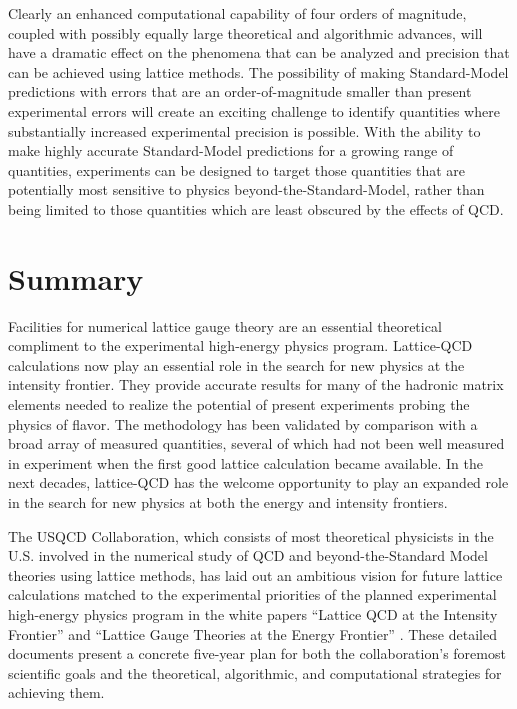 Clearly an enhanced computational capability of four orders of magnitude,
coupled with possibly equally large theoretical and algorithmic advances, will
have a dramatic effect on the phenomena that can be analyzed and precision
that can be achieved using lattice methods.  The possibility of making
Standard-Model predictions with errors that are an order-of-magnitude smaller
than present experimental errors will create an exciting challenge to identify
quantities where substantially increased experimental precision is possible.
With the ability to make highly accurate Standard-Model predictions for a
growing range of quantities, experiments can be designed to target those
quantities that are potentially most sensitive to physics
beyond-the-Standard-Model, rather than being limited to those quantities which
are least obscured by the effects of QCD.

\section{Summary}
\label{sec:lqcd:summ}

Facilities for numerical lattice gauge theory are an essential theoretical
compliment to the experimental high-energy physics program.  Lattice-QCD
calculations now play an essential role in the search for new physics at the
intensity frontier.  They provide accurate results for many of the hadronic
matrix elements needed to realize the potential of present experiments probing
the physics of flavor. The methodology has been validated by comparison with a
broad array of measured quantities, several of which had not been well
measured in experiment when the first good lattice calculation became
available.  In the next decades, lattice-QCD has the welcome opportunity to
play an expanded role in the search for new physics at both the energy and
intensity frontiers.

The USQCD Collaboration, which consists of most theoretical physicists in the
U.S. involved in the numerical study of QCD and beyond-the-Standard Model
theories using lattice methods, has laid out an ambitious vision for future
lattice calculations matched to the experimental priorities of the planned
experimental high-energy physics program in the white papers ``Lattice QCD at
the Intensity Frontier'' and ``Lattice Gauge Theories at the Energy Frontier''
\cite{USQCD_IF_whitepaper13,USQCD_EF_whitepaper13}.  These detailed documents
present a concrete five-year plan for both the collaboration's foremost
scientific goals and the theoretical, algorithmic, and computational
strategies for achieving them.

